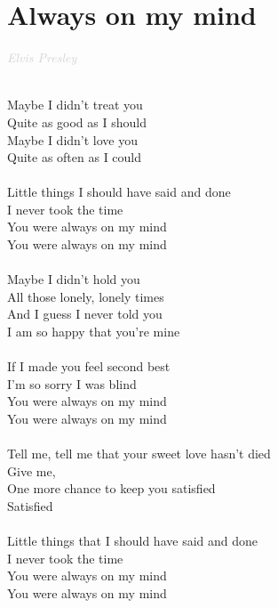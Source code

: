 \documentclass[a5paper, 10pt]{book}
\begin{document}
\section{Always on my mind}\textcolor{lightgray}{\textit{Elvis Presley}}\\~\\
\begin{minipage}[t]{0.8\textwidth}
  Maybe I didn't treat you\\
  Quite as good as I should\\
  Maybe I didn't love you\\
  Quite as often as I could\\
  \\
  \hspace*{3mm}Little things I should have said and done\\
  \hspace*{3mm}I never took the time\\
  \hspace*{3mm}You were always on my mind\\
  \hspace*{3mm}You were always on my mind\\
  \\
  Maybe I didn't hold you\\
  All those lonely, lonely times\\
  And I guess I never told you\\
  I am so happy that you're mine\\
  \\
  \hspace*{3mm}If I made you feel second best\\
  \hspace*{3mm}I'm so sorry I was blind\\
  \hspace*{3mm}You were always on my mind\\
  \hspace*{3mm}You were always on my mind\\
  \\
  \hspace*{6mm}Tell me, tell me that your sweet love hasn't died\\
  \hspace*{6mm}Give me,\\
  \hspace*{6mm}One more chance to keep you satisfied\\
  \hspace*{6mm}Satisfied\\
  \\
  \hspace*{3mm}Little things that I should have said and done\\
  \hspace*{3mm}I never took the time\\
  \hspace*{3mm}You were always on my mind\\
  \hspace*{3mm}You were always on my mind\\
\end{minipage}
\end{document}

